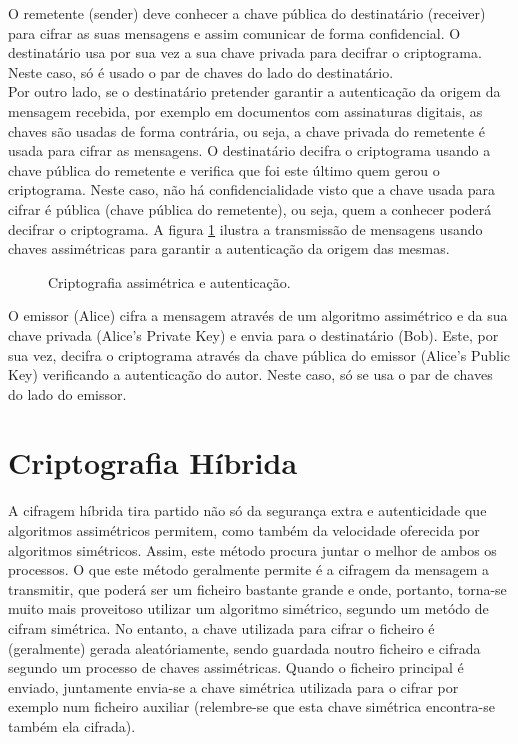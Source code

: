 \documentclass[a4paper,11pt,openright,oneside]{report}
\begin{document}
O remetente (sender) deve conhecer a chave pública do destinatário (receiver) para cifrar as suas mensagens e assim comunicar de forma confidencial. O destinatário usa por sua vez a sua chave privada para decifrar o criptograma. Neste caso, só é usado o par de chaves do lado do destinatário.\\

Por outro lado, se o destinatário pretender garantir a autenticação da origem da mensagem recebida, por exemplo em documentos com assinaturas digitais, as chaves são usadas de forma contrária, ou seja, a chave privada do remetente é usada para cifrar as mensagens. O destinatário decifra o criptograma usando a chave pública do remetente e verifica que foi este último quem gerou o criptograma. Neste caso, não há confidencialidade visto que a chave usada para cifrar é pública (chave pública do remetente), ou seja, quem a conhecer poderá decifrar o criptograma. A figura \ref{fig:crypto4} ilustra a transmissão de mensagens usando chaves assimétricas para garantir a autenticação da origem das mesmas.\\

\begin{figure}[ht]
\center
{}
\caption{Criptografia assimétrica e autenticação.}
\label{fig:crypto4}
\end{figure}

O emissor (Alice) cifra a mensagem através de um algoritmo assimétrico e da sua chave privada (Alice’s Private Key) e envia para o destinatário (Bob). Este, por sua vez, decifra o criptograma através da chave pública do emissor (Alice’s Public Key) verificando a autenticação do autor. Neste caso, só se usa o par de chaves do lado do emissor.

\section{Criptografia Híbrida}
\label{chap.híbrida}

A cifragem híbrida tira partido não só da segurança extra e autenticidade que algoritmos assimétricos permitem, como também da velocidade oferecida por algoritmos simétricos. Assim, este método procura juntar o melhor de ambos os processos. O que este método geralmente permite é a cifragem da mensagem a transmitir, que poderá ser um ficheiro bastante grande e onde, portanto, torna-se muito mais proveitoso utilizar um algoritmo simétrico, segundo um metódo de cifram simétrica. No entanto, a chave utilizada para cifrar o ficheiro é (geralmente) gerada aleatóriamente, sendo guardada noutro ficheiro e cifrada segundo um processo de chaves assimétricas. Quando o ficheiro principal é enviado, juntamente envia-se a chave simétrica utilizada para o cifrar por exemplo num ficheiro auxiliar (relembre-se que esta chave simétrica encontra-se também ela cifrada).\\
\end{document}
